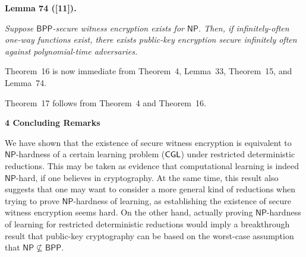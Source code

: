 \documentclass[10pt,a4paper]{article}
\begin{document}


\par\medskip\noindent\textbf{
\textbf{Lemma 74}\textbf{ }([11])\textbf{.}
}\par



\emph{Suppose ${\mathsf{BPP}}$-secure witness encryption exists for ${\mathsf{NP}}$. Then, if infinitely-often one-way functions exist, there exists public-key encryption secure infinitely often against polynomial-time adversaries.}\par






Theorem 16 is now immediate from Theorem 4, Lemma 33, Theorem 15, and Lemma 74.\par




Theorem 17 follows from Theorem 4 and Theorem 16.\par







\par\medskip\noindent\textbf{
4 Concluding Remarks}\par




We have shown that the existence of secure witness encryption is equivalent to ${\mathsf{NP}}$-hardness of a certain learning problem (${\sf CGL}$) under restricted deterministic reductions. This may be taken as evidence that computational learning is indeed ${\mathsf{NP}}$-hard, if one believes in cryptography. At the same time, this result also suggests that one may want to consider a more general kind of reductions when trying to prove ${\mathsf{NP}}$-hardness of learning, as establishing the existence of secure witness encryption seems hard. On the other hand, actually proving ${\mathsf{NP}}$-hardness of learning for restricted deterministic reductions would imply a breakthrough result that public-key cryptography can be based on the worst-case assumption that ${\mathsf{NP}}\not\subseteq{\mathsf{BPP}}$.\par
\end{document}
